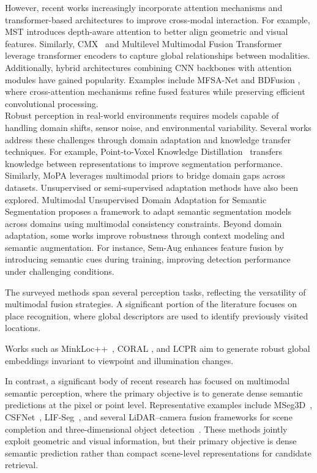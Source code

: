 However, recent works increasingly incorporate attention mechanisms and transformer-based architectures to improve cross-modal interaction. For example, MST \cite{Lamichhane2025} introduces depth-aware attention to better align geometric and visual features. Similarly, CMX~\cite{Zhang2023} and Multilevel Multimodal Fusion Transformer \cite{Ma2024} leverage transformer encoders to capture global relationships between modalities.
Additionally, hybrid architectures combining CNN backbones with attention modules have gained popularity. Examples include MFSA-Net \cite{Duan2024} and BDFusion \cite{LIANG2025408}, where cross-attention mechanisms refine fused features while preserving efficient convolutional processing. \\
Robust perception in real-world environments requires models capable of handling domain shifts, sensor noise, and environmental variability. Several works address these challenges through domain adaptation and knowledge transfer techniques. For example, Point-to-Voxel Knowledge Distillation~\cite{hou2022pointtovoxelknowledgedistillationlidar} transfers knowledge between representations to improve segmentation performance. Similarly, MoPA \cite{Cao2024} leverages multimodal priors to bridge domain gaps across datasets.
Unsupervised or semi-supervised adaptation methods have also been explored. 
Multimodal Unsupervised Domain Adaptation for Semantic Segmentation \cite{2023PatRe.13709299H} proposes a framework to adapt semantic segmentation models across domains using multimodal consistency constraints.
Beyond domain adaptation, some works improve robustness through context modeling and semantic augmentation. For instance, Sem-Aug \cite{Zhao2022} enhances feature fusion by introducing semantic cues during training, improving detection performance under challenging conditions. 

The surveyed methods span several perception tasks, reflecting the versatility of multimodal fusion strategies. A significant portion of the literature focuses on place recognition, where global descriptors are used to identify previously visited locations. 

Works such as MinkLoc++~\cite{komorowski2021minkloclidarmonocularimage}, CORAL \cite{pan2021coralcoloredstructuralrepresentation}, and LCPR \cite{Zhou2023} aim to generate robust global embeddings invariant to viewpoint and illumination changes.

In contrast, a significant body of recent research has focused on multimodal semantic perception, where the primary objective is to generate dense semantic predictions at the pixel or point level. Representative examples include MSeg3D~\cite{Li2023}, CSFNet~\cite{LuoYang2025}, LIF-Seg~\cite{Zhao2024}, and several LiDAR--camera fusion frameworks for scene completion and three-dimensional object detection~\cite{Lu2024,Zhao2022}. These methods jointly exploit geometric and visual information, but their primary objective is dense semantic prediction rather than compact scene-level representations for candidate retrieval.

